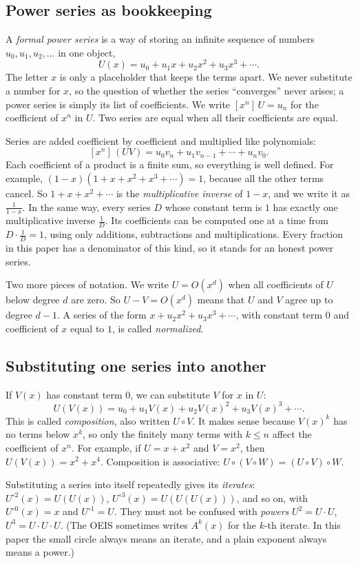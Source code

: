 \documentclass[11pt,a4paper]{article}
\theoremstyle{definition}
\theoremstyle{remark}
\newcommand{\coeff}[2]{[x^{#1}]\,#2}
\begin{document}
\subsection{Power series as bookkeeping}
A \emph{formal power series} is a way of storing an infinite sequence of numbers $u_0,u_1,u_2,\dots$ in one object,
\[
U(x)=u_0+u_1x+u_2x^2+u_3x^3+\cdots .
\]
The letter $x$ is only a placeholder that keeps the terms apart. We never substitute a number for $x$, so the question
of whether the series ``converges'' never arises; a power series is simply its list of coefficients. We write
$\coeff{n}{U}=u_n$ for the coefficient of $x^n$ in $U$. Two series are equal when all their coefficients are equal.

Series are added coefficient by coefficient and multiplied like polynomials:
\[
\coeff{n}{(UV)}=u_0v_n+u_1v_{n-1}+\cdots+u_nv_0 .
\]
Each coefficient of a product is a finite sum, so everything is well defined. For example,
$(1-x)(1+x+x^2+x^3+\cdots)=1$, because all the other terms cancel. So $1+x+x^2+\cdots$ is the
\emph{multiplicative inverse} of $1-x$, and we write it as $\frac{1}{1-x}$. In the same way, every series $D$ whose
constant term is $1$ has exactly one multiplicative inverse $\frac1D$. Its coefficients can be computed one at a time
from $D\cdot\frac1D=1$, using only additions, subtractions and multiplications. Every fraction in this paper has a
denominator of this kind, so it stands for an honest power series.

Two more pieces of notation. We write $U=O(x^d)$ when all coefficients of $U$ below degree $d$ are zero. So
$U-V=O(x^d)$ means that $U$ and $V$ agree up to degree $d-1$. A series of the form $x+u_2x^2+u_3x^3+\cdots$, with
constant term $0$ and coefficient of $x$ equal to $1$, is called \emph{normalized}.

\subsection{Substituting one series into another}
If $V(x)$ has constant term $0$, we can substitute $V$ for $x$ in $U$:
\[
U(V(x))=u_0+u_1V(x)+u_2V(x)^2+u_3V(x)^3+\cdots .
\]
This is called \emph{composition}, also written $U\circ V$. It makes sense because $V(x)^k$ has no terms below $x^k$,
so only the finitely many terms with $k\le n$ affect the coefficient of $x^n$. For example, if $U=x+x^2$ and $V=x^2$, then
$U(V(x))=x^2+x^4$. Composition is associative: $U\circ(V\circ W)=(U\circ V)\circ W$.

Substituting a series into itself repeatedly gives its \emph{iterates}: $U^{\circ2}(x)=U(U(x))$,
$U^{\circ3}(x)=U(U(U(x)))$, and so on, with $U^{\circ0}(x)=x$ and $U^{\circ1}=U$. They must not be confused with
\emph{powers} $U^2=U\cdot U$, $U^3=U\cdot U\cdot U$. (The OEIS sometimes writes $A^k(x)$ for the $k$-th iterate. In
this paper the small circle always means an iterate, and a plain exponent always means a power.)
\end{document}
